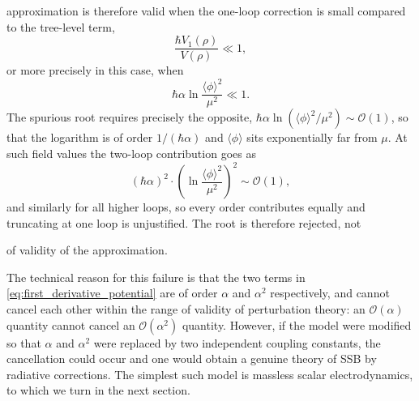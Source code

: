 approximation is therefore valid when the one-loop correction is small
compared to the tree-level term,
\begin{equation}
    \frac{\hbar V_1(\rho)}{V(\rho)} \ll 1,
\end{equation}
or more precisely in this case, when
\begin{equation}
    \hbar\alpha\ln\frac{\langle\phi\rangle^2}{\mu^2} \ll 1.
\end{equation}
The spurious root requires precisely the opposite,
$\hbar\alpha\ln(\langle\phi\rangle^2/\mu^2) \sim \mathcal{O}(1)$, so that
the logarithm is of order $1/(\hbar\alpha)$ and $\langle\phi\rangle$ sits
exponentially far from $\mu$. At such field values the two-loop
contribution goes as
\begin{equation}
    (\hbar\alpha)^2\cdot\left(\ln\frac{\langle\phi\rangle^2}{\mu^2}
    \right)^2 \sim \mathcal{O}(1),
\end{equation}
and similarly for all higher loops, so every order contributes equally and
truncating at one loop is unjustified. The root is therefore rejected, not

of validity of the approximation.



The technical reason for this failure is that the two terms in
\eqref{eq:first_derivative_potential} are of order $\alpha$ and
$\alpha^2$ respectively, and cannot cancel each other within the range of
validity of perturbation theory: an $\mathcal{O}(\alpha)$ quantity cannot
cancel an $\mathcal{O}(\alpha^2)$ quantity. However, if the model were
modified so that $\alpha$ and $\alpha^2$ were replaced by two independent
coupling constants, the cancellation could occur and one would obtain a
genuine theory of SSB by radiative corrections. The simplest such model
is massless scalar electrodynamics, to which we turn in the next section.
